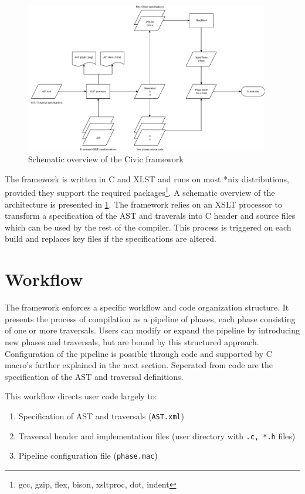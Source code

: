 \documentclass[twoside,openright]{uva-bachelor-thesis}
\newcommand{\code}[1]{\texttt{\footnotesize#1}}
\begin{document}
		\begin{figure}[H]
			\centering
			\includegraphics[width=0.95\textwidth]{figures/architecture/overview.pdf}
			\caption{Schematic overview of the Civic framework}
			\label{build-dep}
		\end{figure}
		
		The framework is written in C and XLST and runs on most *nix distributions, provided they support the required packages\footnote{gcc, gzip, flex, bison, xsltproc, dot, indent}. A schematic overview of the architecture is presented in \cref{build-dep}. The framework relies on an XSLT processor to transform a specification of the AST and traverals into C header and source files which can be used by the rest of the compiler. This process is triggered on each build and replaces key files if the specifications are altered.
		
		
	\section{Workflow}
	\label{c-workflow}
		The framework enforces a specific workflow and code organization structure. It presents the process of compilation as a pipeline of phases, each phase consisting of one or more traversals. Users can modify or expand the pipeline by introducing new phases and traversals, but are bound by this structured approach. Configuration of the pipeline is possible through code and supported by C macro's further explained in the next section. Seperated from code are the specification of the AST and traversal definitions. 
		
		This workflow directs user code largely to:	
		\begin{enumerate}
			\item Specification of AST and traversals (\code{AST.xml})
			\item Traversal header and implementation files (user directory with \code{*.c, *.h} files)
			\item Pipeline configuration file (\code{phase.mac})
		\end{enumerate}
		
\end{document}

